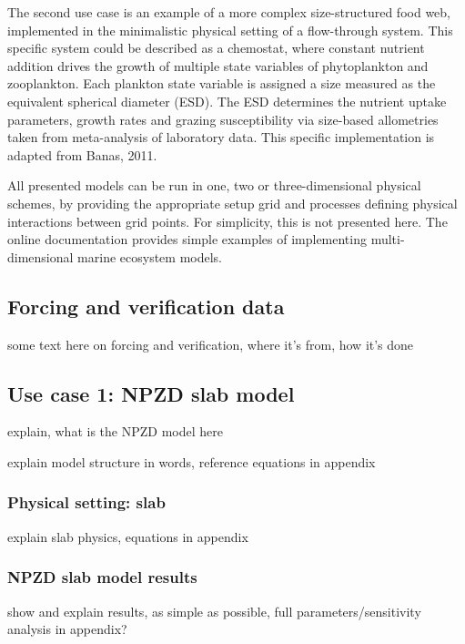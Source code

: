 \documentclass[journal abbreviation, manuscript]{copernicus}
\begin{document}
The second use case is an example of a more complex size-structured food web, implemented in the minimalistic physical setting of a flow-through system. This specific system could be described as a chemostat, where constant nutrient addition drives the growth of multiple state variables of phytoplankton and zooplankton. Each plankton state variable is assigned a size measured as the equivalent spherical diameter (ESD). The ESD determines the nutrient uptake parameters, growth rates and grazing susceptibility via size-based allometries taken from meta-analysis of laboratory data. This specific implementation is adapted from Banas, 2011.

All presented models can be run in one, two or three-dimensional physical schemes, by providing the appropriate setup grid and processes defining physical interactions between grid points. For simplicity, this is not presented here. The online documentation provides simple examples of implementing multi-dimensional marine ecosystem models.



\subsection{Forcing and verification data}

some text here on forcing and verification, where it's from, how it's done


\subsection{Use case 1: NPZD slab model}

explain, what is the NPZD model here

explain model structure in words, reference equations in appendix

\subsubsection{Physical setting: slab}
explain slab physics, equations in appendix



\subsubsection{NPZD slab model results}
show and explain results, as simple as possible, full parameters/sensitivity analysis in appendix?
\end{document}
